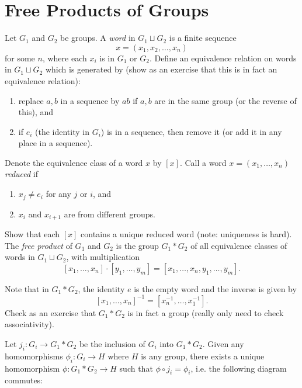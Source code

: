 \section{Free Products of Groups}

\begin{definition}
  Let $G_1$ and $G_2$ be groups. A \emph{word} in
  $G_1 \sqcup G_2$ is a finite sequence
  \[
    x = (x_1, x_2, \dots, x_n)
  \]
  for some $n$, where each $x_i$ is in $G_1$ or $G_2$.
  Define an equivalence relation on words in
  $G_1 \sqcup G_2$ which is generated by (show as
  an exercise that this is in fact an equivalence
  relation):
  \begin{enumerate}
    \item replace $a, b$ in a sequence by $ab$ if
      $a, b$ are in the same group (or the reverse of this), and
    \item if $e_i$ (the identity in $G_i$) is in
      a sequence, then remove it (or add it in any
      place in a sequence).
  \end{enumerate}
  Denote the equivalence class of a word $x$ by $[x]$.
  Call a word $x = (x_1, \dots, x_n)$ \emph{reduced} if
  \begin{enumerate}
    \item $x_j \ne e_i$ for any $j$ or $i$, and
    \item $x_i$ and $x_{i + 1}$ are from different
      groups.
  \end{enumerate}
  Show that each $[x]$ contains a unique reduced word
  (note: uniqueness is hard).
  The \emph{free product} of $G_1$ and $G_2$ is
  the group $G_1 * G_2$ of all equivalence classes of
  words in $G_1 \sqcup G_2$, with multiplication
  \[
    [x_1, \dots, x_n] \cdot [y_1, \dots, y_m]
    = [x_1, \dots, x_n, y_1, \dots, y_m].
  \]
\end{definition}

\begin{remark}
  Note that in $G_1 * G_2$, the identity
  $e$ is the empty word and the inverse is given by
  \[[x_1, \dots, x_n]^{-1} = [x_n^{-1}, \dots, x_1^{-1}].\]
  Check as an exercise that $G_1 * G_2$ is in
  fact a group (really only need to check associativity).
\end{remark}

\begin{prop}
  Let $j_i : G_i \to G_1 * G_2$ be the inclusion
  of $G_i$ into $G_1 * G_2$. Given any homomorphisms
  $\phi_i : G_i \to H$ where $H$ is any group, there
  exists a unique homomorphism
  $\phi : G_1 * G_2 \to H$ such that
  $\phi \circ j_i = \phi_i$, i.e.
  the following diagram commutes:
  \begin{center}
  \end{center}
\end{prop}

